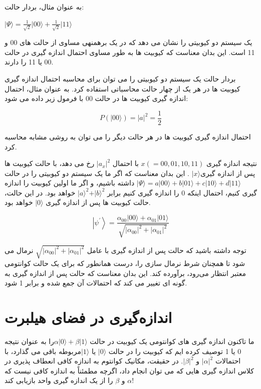 \documentclass{book}
\begin{document}
به عنوان مثال، بردار حالت:

\begin{center}
$\vert \Psi \rangle = \frac{1}{\sqrt{2}} \vert00\rangle + \frac{1}{\sqrt{2}} \vert11\rangle$	
\end{center}

یک سیستم دو کیوبیتی را نشان می دهد که در یک برهمنهی مساوی از حالت های 00 و 11 است. این بدان معناست که کیوبیت ها به طور مساوی احتمال اندازه گیری در حالت 00 یا 11 را دارند.

بردار حالت یک سیستم دو کیوبیتی را می توان برای محاسبه احتمال اندازه گیری کیوبیت ها در هر یک از چهار حالت محاسباتی استفاده کرد. به عنوان مثال، احتمال اندازه گیری کیوبیت ها در حالت 00 با فرمول زیر داده می شود:
\begin{center}\label{possible value}
\begin{equation}
	P(\vert00\rangle) = \vert a\vert^ 2 = \frac{1}{2}
\end{equation}
\end{center}


احتمال اندازه گیری کیوبیت ها در هر حالت دیگر را می توان به روشی مشابه محاسبه کرد.

نتیجه اندازه گیری $x (= 00, 01, 10 , 11)$ با احتمال $\vert a_{x} \vert ^ 2$ رخ می دهد، با حالت کیوبیت ها پس از اندازه گیری$\vert x \rangle$ . این بدان معناست که اگر ما یک سیستم دو کیوبیتی را در حالت
$\vert \Psi \rangle = a \vert00\rangle + b \vert01\rangle + c \vert10\rangle + d \vert11\rangle $ داشته باشیم، و اگر ما اولین کیوبیت را اندازه گیری کنیم، احتمال اینکه 0 را اندازه گیری کنیم برابر $\vert a \rangle^2 + \vert b \rangle ^ 2$ خواهد بود. در این حالت، حالت کیوبیت ها پس از اندازه گیری $\vert 0 \rangle$ خواهد بود.




\begin{center}
	\begin{equation}\label{psi after mesurment}
		\left|\psi^{\prime}\right\rangle=\frac{\alpha_{00}|00\rangle+\alpha_{01}|01\rangle}{\sqrt{\left|\alpha_{00}\right|^2+\left|\alpha_{01}\right|^2}}
	\end{equation}
\end{center}
توجه داشته باشید که حالت پس از اندازه گیری با عامل $\sqrt{|{α}_{00}|^2 + |{α}_{01}|^2}$ نرمال می شود
تا همچنان شرط نرمال سازی را، درست همانطور که برای یک
حالت کوانتومی معتبر انتظار می‌‌رود، برآورده کند. این بدان معناست که حالت پس از اندازه گیری به گونه ای تغییر می کند که احتمالات آن جمع شده و برابر 1 شود.

\section{اندازه‌گیری در فضای هیلبرت}
ما تاکنون اندازه گیری های کوانتومی یک کیوبیت در حالت $\alpha\vert0\rangle + \beta\vert1\rangle$را به عنوان نتیجه 0 یا 1 توصیف کرده ایم که کیوبیت را در حالت $\vert 0 \rangle$ یا $\vert 1 \rangle$مربوطه باقی می گذارد، با احتمالات $\vert\alpha\vert ^ 2$ و $\vert\beta\vert ^ 2$. در حقیقت، مکانیک کوانتوم به اندازه کافی انعطاف پذیری در کلاس اندازه گیری هایی که می توان انجام داد، اگرچه مطمئناً به اندازه کافی نیست که $\alpha$ و $\beta$ را از یک اندازه گیری واحد بازیابی کند!
\end{document}
